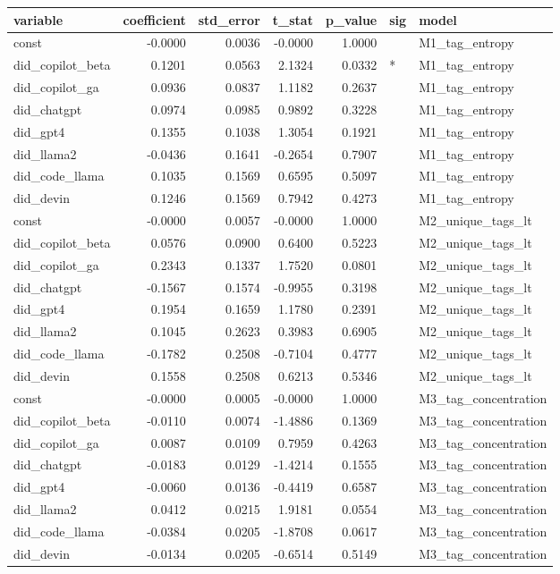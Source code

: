 \begin{tabular}{lrrrrll}
\toprule
variable & coefficient & std_error & t_stat & p_value & sig & model \\
\midrule
const & -0.0000 & 0.0036 & -0.0000 & 1.0000 &  & M1_tag_entropy \\
did_copilot_beta & 0.1201 & 0.0563 & 2.1324 & 0.0332 & * & M1_tag_entropy \\
did_copilot_ga & 0.0936 & 0.0837 & 1.1182 & 0.2637 &  & M1_tag_entropy \\
did_chatgpt & 0.0974 & 0.0985 & 0.9892 & 0.3228 &  & M1_tag_entropy \\
did_gpt4 & 0.1355 & 0.1038 & 1.3054 & 0.1921 &  & M1_tag_entropy \\
did_llama2 & -0.0436 & 0.1641 & -0.2654 & 0.7907 &  & M1_tag_entropy \\
did_code_llama & 0.1035 & 0.1569 & 0.6595 & 0.5097 &  & M1_tag_entropy \\
did_devin & 0.1246 & 0.1569 & 0.7942 & 0.4273 &  & M1_tag_entropy \\
const & -0.0000 & 0.0057 & -0.0000 & 1.0000 &  & M2_unique_tags_lt \\
did_copilot_beta & 0.0576 & 0.0900 & 0.6400 & 0.5223 &  & M2_unique_tags_lt \\
did_copilot_ga & 0.2343 & 0.1337 & 1.7520 & 0.0801 &  & M2_unique_tags_lt \\
did_chatgpt & -0.1567 & 0.1574 & -0.9955 & 0.3198 &  & M2_unique_tags_lt \\
did_gpt4 & 0.1954 & 0.1659 & 1.1780 & 0.2391 &  & M2_unique_tags_lt \\
did_llama2 & 0.1045 & 0.2623 & 0.3983 & 0.6905 &  & M2_unique_tags_lt \\
did_code_llama & -0.1782 & 0.2508 & -0.7104 & 0.4777 &  & M2_unique_tags_lt \\
did_devin & 0.1558 & 0.2508 & 0.6213 & 0.5346 &  & M2_unique_tags_lt \\
const & -0.0000 & 0.0005 & -0.0000 & 1.0000 &  & M3_tag_concentration \\
did_copilot_beta & -0.0110 & 0.0074 & -1.4886 & 0.1369 &  & M3_tag_concentration \\
did_copilot_ga & 0.0087 & 0.0109 & 0.7959 & 0.4263 &  & M3_tag_concentration \\
did_chatgpt & -0.0183 & 0.0129 & -1.4214 & 0.1555 &  & M3_tag_concentration \\
did_gpt4 & -0.0060 & 0.0136 & -0.4419 & 0.6587 &  & M3_tag_concentration \\
did_llama2 & 0.0412 & 0.0215 & 1.9181 & 0.0554 &  & M3_tag_concentration \\
did_code_llama & -0.0384 & 0.0205 & -1.8708 & 0.0617 &  & M3_tag_concentration \\
did_devin & -0.0134 & 0.0205 & -0.6514 & 0.5149 &  & M3_tag_concentration \\
\bottomrule
\end{tabular}
